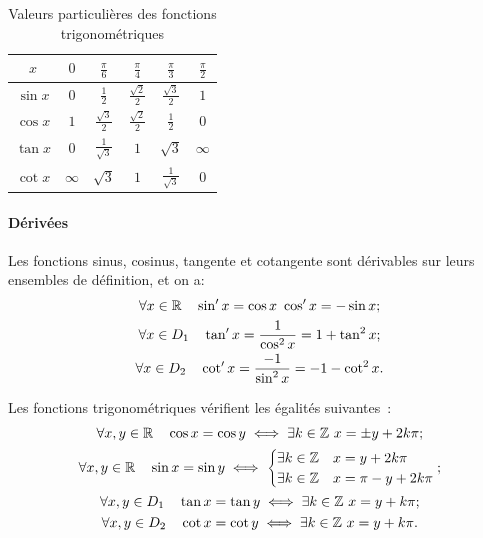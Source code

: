 %
\renewcommand{\arraystretch}{2.2}
\begin{table}
  \centering
  \begin{tabular}{|c|c|c|c|c|c|}
    \hline
    $\displaystyle x$& $\displaystyle 0$&$\displaystyle \frac{\pi}{6}$&$\displaystyle \frac{\pi}{4}$&$\displaystyle \frac{\pi}{3}$&$\displaystyle \frac{\pi}{2}$\\ \hline
    $\displaystyle \sin x$ &$\displaystyle  0$ &$\displaystyle  \frac{1}{2}$ &$\displaystyle  \frac{\sqrt{2}}{2}$ & $\displaystyle \frac{\sqrt{3}}{2}$ &$\displaystyle  1 $\\ \hline
    $\displaystyle \cos x$ &$\displaystyle  1 $&$\displaystyle \frac{\sqrt{3}}{2}$ & $\displaystyle \frac{\sqrt{2}}{2}$ & $\displaystyle \frac{1}{2}$ & $\displaystyle 0$ \\ \hline
    $\displaystyle \tan x$ & $\displaystyle  0 $&$\displaystyle \frac{1}{\sqrt{3}}$ & $\displaystyle 1$ & $\displaystyle \sqrt{3}$ & $\displaystyle \infty$ \\ \hline
    $\displaystyle \cot x$ & $\displaystyle \infty$ & $\displaystyle \sqrt{3}$ &$\displaystyle  1$ & $\displaystyle \frac{1}{\sqrt{3}}$ &$\displaystyle  0$\\ \hline
  \end{tabular}
  \caption{Valeurs particulières des fonctions trigonométriques}
  \label{tab:valeurpart}
\end{table}
\renewcommand{\arraystretch}{1}
\paragraph{Dérivées}
Les fonctions sinus, cosinus, tangente et cotangente sont dérivables sur leurs ensembles de définition, et on a:
\begin{gather}
\forall x \in \mathbb{R} \quad \sin'x=\cos x \ \cos'x=-\sin x; \\
\forall x \in D_1 \quad \tan'x=\frac{1}{\cos^2 x}=1+\tan^2 x; \\
\forall x \in D_2 \quad \cot'x=\frac{-1}{\sin^2 x}=-1-\cot^2 x.
\end{gather}
\begin{prop}
  Les fonctions trigonométriques vérifient les égalités suivantes~:
  \begin{gather}
    \forall x, y \in \R \quad \cos x = \cos y \iff \exists k \in \Z \ x=\pm y + 2k\pi;\\
    \forall x, y \in \R \quad \sin x = \sin y \iff \begin{cases} \exists k \in \Z & x = y + 2 k \pi \\ \exists k \in \Z & x = \pi - y + 2 k \pi\end{cases}; \\
    \forall x, y \in D_1 \quad \tan x = \tan y \iff \exists k \in \Z \ x = y + k \pi;\\
    \forall x, y \in D_2 \quad \cot x = \cot y \iff \exists k \in \Z \ x = y + k \pi.
  \end{gather}
\end{prop}

